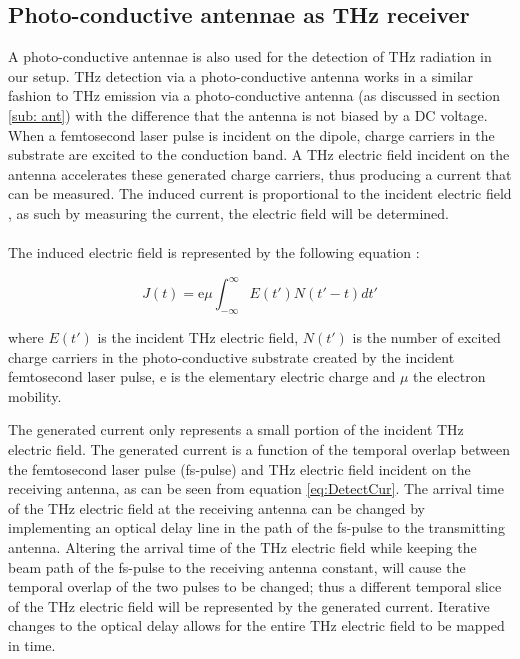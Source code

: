 \subsection{Photo-conductive antennae as THz receiver}
\label{sub: antr}
A photo-conductive antennae is also used for the detection of THz radiation in our setup. THz detection via a photo-conductive antenna works in a similar fashion to THz emission via a photo-conductive antenna (as discussed in section \ref{sub: ant}) with the difference that the antenna is not biased by a DC voltage. When a femtosecond laser pulse is incident on the dipole, charge carriers in the substrate are excited to the conduction band. A THz electric field incident on the antenna accelerates these generated charge carriers, thus producing a current that can be measured. The induced current is proportional to the incident electric field \cite{Sakai-2005}, as such by measuring the current, the electric field will be determined.
\paragraph{}
The induced electric field is represented by the following equation \cite{Sakai-2005}: 

\begin{equation}
J(t) = \text{e}\mu\int^{\infty}_{-\infty}E(t')N(t'-t)dt'
\label{eq:DetectCur}
\end{equation}

where $E(t')$ is the incident THz electric field, $N(t')$ is the number of excited charge carriers in the photo-conductive substrate created by the incident femtosecond laser pulse, e is the elementary electric charge and $\mu$ the electron mobility. 

The generated current only represents a small portion of the incident THz electric field. The generated current is a function of the temporal overlap between the femtosecond laser pulse (fs-pulse) and THz electric field incident on the receiving antenna, as can be seen from equation \ref{eq:DetectCur}. The arrival time of the THz electric field at the receiving antenna can be changed by implementing an optical delay line in the path of the fs-pulse to the transmitting antenna. Altering the arrival time of the THz electric field while keeping the beam path of the fs-pulse to the receiving antenna constant, will cause the temporal overlap of the two pulses to be changed; thus a different temporal slice of the THz electric field will be represented by the generated current. Iterative changes to the optical delay allows for the entire THz electric field to be mapped in time.  

